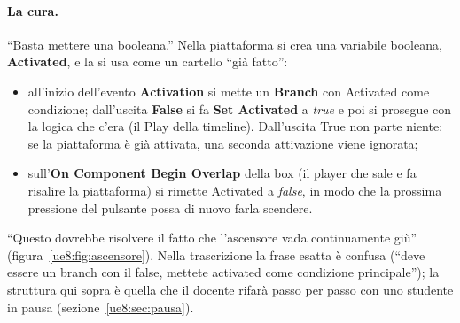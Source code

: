 \paragraph{La cura.} ``Basta mettere una booleana.'' Nella piattaforma si crea una
variabile booleana, \textbf{Activated}, e la si usa come un cartello ``già fatto'':
\begin{itemize}
  \item all'inizio dell'evento \textbf{Activation} si mette un \textbf{Branch} con
        Activated come condizione; dall'uscita \textbf{False} si fa \textbf{Set
        Activated} a \emph{true} e poi si prosegue con la logica che c'era (il Play
        della timeline). Dall'uscita True non parte niente: se la piattaforma è già
        attivata, una seconda attivazione viene ignorata;
  \item sull'\textbf{On Component Begin Overlap} della box (il player che sale e fa
        risalire la piattaforma) si rimette Activated a \emph{false}, in modo che la
        prossima pressione del pulsante possa di nuovo farla scendere.
\end{itemize}
``Questo dovrebbe risolvere il fatto che l'ascensore vada continuamente giù''
(figura~\ref{ue8:fig:ascensore}). Nella trascrizione la frase esatta è confusa
(``deve essere un branch con il false, mettete activated come condizione principale'');
la struttura qui sopra è quella che il docente rifarà passo per passo con uno studente
in pausa (sezione~\ref{ue8:sec:pausa}).

